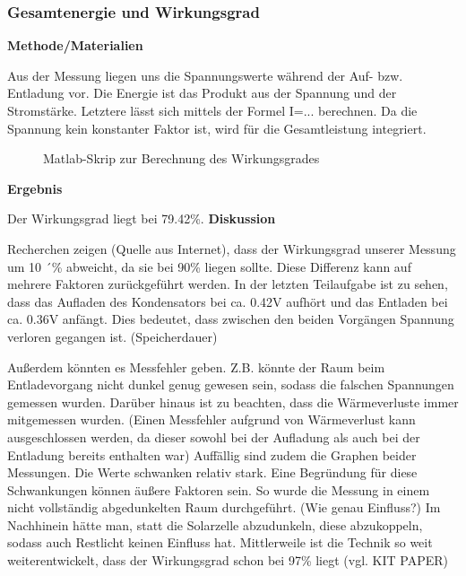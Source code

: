     \subsubsection{Gesamtenergie und Wirkungsgrad}                      %
        \textbf{Methode/Materialien}
        \par Aus der Messung liegen uns die Spannungswerte während der Auf- bzw. Entladung vor. Die Energie ist das Produkt aus der Spannung und der Stromstärke. Letztere lässt sich mittels der Formel I=... berechnen. Da die Spannung kein konstanter Faktor ist, wird für die Gesamtleistung integriert.
        \begin{figure}[H]
            
            \caption{Matlab-Skrip zur Berechnung des Wirkungsgrades}
        \end{figure}
        \vspace{4mm}
        \textbf{Ergebnis}
        \newline
        \par Der Wirkungsgrad liegt bei 79.42\%.
        \vspace{4mm}
        \newline
        \textbf{Diskussion}
        \newline
        \par Recherchen zeigen (Quelle aus Internet), dass der Wirkungsgrad unserer Messung um 10 ´\% abweicht, da
        sie bei 90\% liegen sollte. Diese Differenz kann auf mehrere Faktoren zurückgeführt werden.
        In der letzten Teilaufgabe ist zu sehen, dass das Aufladen des Kondensators bei ca. 0.42V aufhört und
        das Entladen bei ca. 0.36V anfängt. Dies bedeutet, dass zwischen den beiden Vorgängen Spannung
        verloren gegangen ist. (Speicherdauer)
        \par Außerdem könnten es Messfehler geben. Z.B. könnte der Raum beim Entladevorgang nicht dunkel
        genug gewesen sein, sodass die falschen Spannungen gemessen wurden. Darüber hinaus ist zu beachten,
        dass die Wärmeverluste immer mitgemessen wurden. (Einen Messfehler aufgrund von Wärmeverlust kann ausgeschlossen werden, da dieser sowohl bei der Aufladung als auch bei der Entladung bereits enthalten war)
        Auffällig sind zudem die Graphen beider Messungen. Die Werte schwanken relativ stark. Eine Begründung für diese Schwankungen können äußere Faktoren sein. So wurde die Messung in einem nicht vollständig abgedunkelten Raum durchgeführt. (Wie genau Einfluss?) Im Nachhinein hätte man, statt die Solarzelle abzudunkeln, diese abzukoppeln, sodass auch Restlicht keinen Einfluss hat. 
        Mittlerweile ist die Technik so weit weiterentwickelt, dass der Wirkungsgrad schon bei 97\% liegt (vgl. KIT PAPER) 
        
